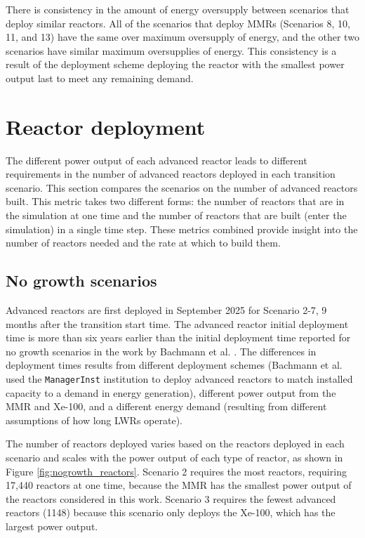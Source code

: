 There is consistency in the amount of energy oversupply between scenarios that deploy similar reactors.
All of the scenarios that deploy \glspl{MMR} (Scenarios 8, 10, 11, and 13) have the 
same over maximum oversupply of energy, and the other two scenarios 
have similar maximum oversupplies of energy. This consistency 
is a result of the deployment scheme deploying the reactor with the 
smallest power output last to meet any remaining demand. 

\section{Reactor deployment}
The different power output of each advanced reactor leads to different 
requirements in the number of advanced reactors deployed in each transition 
scenario. 
This section compares the scenarios on the number of advanced reactors 
built. This metric takes two 
different forms: the number of reactors that are in the simulation at 
one time and the number of reactors that are built (enter the simulation)
in a single time step. These metrics combined provide insight into the 
number of reactors needed and the rate at which to build them. 

\subsection{No growth scenarios} \label{sec:nogrowth_reactors}
Advanced reactors are first deployed in September 2025 for Scenario 2-7, 
9 months after the transition start time. The advanced reactor initial 
deployment time is more than six years earlier than the initial deployment 
time reported for no growth scenarios in the work by Bachmann et al.  
\cite{bachmann_enrichment_2021}. The differences in deployment times results 
from different deployment schemes (Bachmann et al. used the \Cycamore 
\texttt{ManagerInst} institution to deploy advanced reactors to match installed 
capacity to a demand in energy generation), different power output from 
the \gls{MMR} and Xe-100, and a different energy demand 
(resulting from different assumptions of how long \glspl{LWR} operate). 

The number of reactors deployed varies based on 
the reactors deployed in each scenario and scales with the power output of 
each type of reactor, as shown in Figure \ref{fig:nogrowth_reactors}. Scenario
2 requires the most reactors, requiring 17,440 reactors at one time, 
because the \gls{MMR} has the smallest power output of the reactors 
considered in this work. Scenario 3 requires the fewest 
advanced reactors (1148) because this scenario only deploys the Xe-100,
which has the largest power output. 

